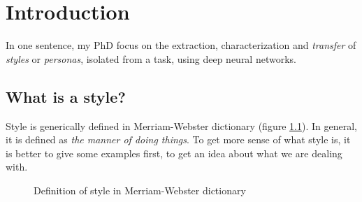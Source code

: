 \chapter{Introduction}
\minitoc%

\par In one sentence, my PhD focus on the extraction, characterization and \textit{transfer} of \textit{styles} or \textit{personas}, isolated from a task, using deep neural networks.

\section{What is a style?}\label{sec:style}
  \par Style is generically defined in Merriam-Webster dictionary (figure \ref{fig:style_def_webster}). In general, it is defined as \textit{the manner of doing things}\citep{gallaher1992individual}. To get more sense of what style is, it is better to give some examples first, to get an idea about what we are dealing with.

  \begin{figure}[!htbp]
    \centering
    \caption{Definition of style in Merriam-Webster dictionary}
    \label{fig:style_def_webster}
  \end{figure}

